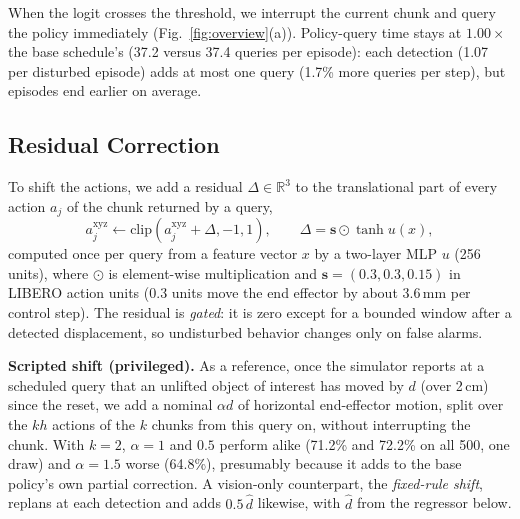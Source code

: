 \documentclass[conference,a4paper]{IEEEtran}
\begin{document}
When the logit crosses the threshold, we interrupt the current
chunk and query the policy immediately (Fig.~\ref{fig:overview}(a)). Policy-query time stays at $1.00\times$ the base schedule's (37.2 versus 37.4 queries per episode): each detection (1.07 per disturbed episode) adds at most one query (1.7\% more queries per step), but episodes end earlier on average.

\subsection{Residual Correction}
To shift the actions, we add a residual $\Delta\in\mathbb{R}^3$ to the translational part of every
action $a_j$ of the chunk returned by a query,
\begin{equation}
a_j^{\mathrm{xyz}} \leftarrow \mathrm{clip}(a_j^{\mathrm{xyz}}+\Delta,-1,1),\qquad
\Delta=\mathbf{s}\odot\tanh u(x),
\label{eq:residual}
\end{equation}
computed once per query from a feature vector $x$ by a two-layer MLP $u$ (256 units), where $\odot$ is element-wise multiplication and $\mathbf{s}=(0.3,0.3,0.15)$ in LIBERO action units (0.3 units move the end effector by about 3.6\,mm per control step). The residual is \emph{gated}: it is zero except for a bounded window after
a detected displacement, so undisturbed behavior changes only on false
alarms.

\noindent\textbf{Scripted shift (privileged).}
As a reference, once the simulator reports at a scheduled query that an unlifted object of interest has moved by $d$ (over 2\,cm) since the reset, we add a nominal $\alpha d$ of horizontal end-effector motion, split over the $kh$ actions of the $k$ chunks from this query on, without interrupting the chunk. With $k=2$, $\alpha=1$ and $0.5$ perform alike (71.2\% and 72.2\% on all 500, one draw) and $\alpha=1.5$ worse (64.8\%), presumably because it adds to the base policy's own partial correction. A vision-only counterpart, the \emph{fixed-rule shift}, replans at each detection and adds $0.5\,\hat d$ likewise,
with $\hat d$ from the regressor below.
\end{document}
